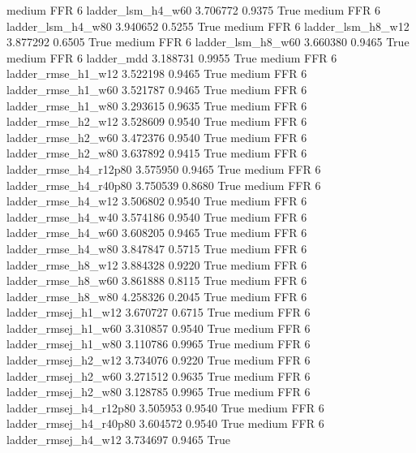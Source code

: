     medium      FFR                 6      ladder_lsm_h4_w60   3.706772      0.9375    True
    medium      FFR                 6      ladder_lsm_h4_w80   3.940652      0.5255    True
    medium      FFR                 6      ladder_lsm_h8_w12   3.877292      0.6505    True
    medium      FFR                 6      ladder_lsm_h8_w60   3.660380      0.9465    True
    medium      FFR                 6             ladder_mdd   3.188731      0.9955    True
    medium      FFR                 6     ladder_rmse_h1_w12   3.522198      0.9465    True
    medium      FFR                 6     ladder_rmse_h1_w60   3.521787      0.9465    True
    medium      FFR                 6     ladder_rmse_h1_w80   3.293615      0.9635    True
    medium      FFR                 6     ladder_rmse_h2_w12   3.528609      0.9540    True
    medium      FFR                 6     ladder_rmse_h2_w60   3.472376      0.9540    True
    medium      FFR                 6     ladder_rmse_h2_w80   3.637892      0.9415    True
    medium      FFR                 6  ladder_rmse_h4_r12p80   3.575950      0.9465    True
    medium      FFR                 6  ladder_rmse_h4_r40p80   3.750539      0.8680    True
    medium      FFR                 6     ladder_rmse_h4_w12   3.506802      0.9540    True
    medium      FFR                 6     ladder_rmse_h4_w40   3.574186      0.9540    True
    medium      FFR                 6     ladder_rmse_h4_w60   3.608205      0.9465    True
    medium      FFR                 6     ladder_rmse_h4_w80   3.847847      0.5715    True
    medium      FFR                 6     ladder_rmse_h8_w12   3.884328      0.9220    True
    medium      FFR                 6     ladder_rmse_h8_w60   3.861888      0.8115    True
    medium      FFR                 6     ladder_rmse_h8_w80   4.258326      0.2045    True
    medium      FFR                 6    ladder_rmsej_h1_w12   3.670727      0.6715    True
    medium      FFR                 6    ladder_rmsej_h1_w60   3.310857      0.9540    True
    medium      FFR                 6    ladder_rmsej_h1_w80   3.110786      0.9965    True
    medium      FFR                 6    ladder_rmsej_h2_w12   3.734076      0.9220    True
    medium      FFR                 6    ladder_rmsej_h2_w60   3.271512      0.9635    True
    medium      FFR                 6    ladder_rmsej_h2_w80   3.128785      0.9965    True
    medium      FFR                 6 ladder_rmsej_h4_r12p80   3.505953      0.9540    True
    medium      FFR                 6 ladder_rmsej_h4_r40p80   3.604572      0.9540    True
    medium      FFR                 6    ladder_rmsej_h4_w12   3.734697      0.9465    True
